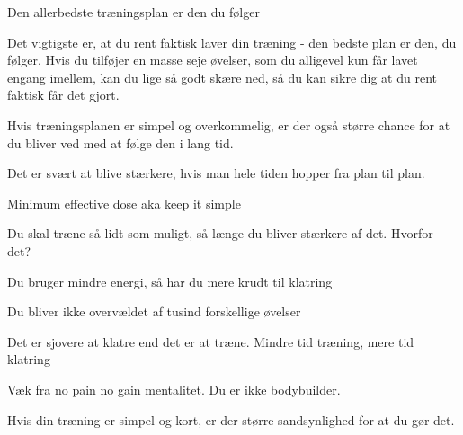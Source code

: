 \begin{multicols}{2}
  \begin{tList}{Den allerbedste træningsplan er den du følger}
  \item Det vigtigste er, at du rent faktisk laver din træning - den
    bedste plan er den, du følger. Hvis du tilføjer en masse seje
    øvelser, som du alligevel kun får lavet engang imellem, kan du
    lige så godt skære ned, så du kan sikre dig at du rent faktisk
    får det gjort.
  \item Hvis træningsplanen er simpel og overkommelig, er der også
    større chance for at du bliver ved med at følge den i lang tid.
  \item  Det er svært at blive stærkere, hvis man hele tiden hopper
    fra plan til plan.
  \end{tList}

\columnbreak

  \begin{tList}{Minimum effective dose aka keep it simple}
  \item Du skal træne så lidt som muligt, så længe du bliver stærkere
    af det. Hvorfor det?

  \item Du bruger mindre energi, så har du mere krudt til klatring
  \item Du bliver ikke overvældet af tusind forskellige øvelser
  \item Det er sjovere at klatre end det er at træne. Mindre tid
    træning, mere tid klatring

  \item Væk fra no pain no gain mentalitet. Du er ikke bodybuilder.
  \item Hvis din træning er simpel og kort, er der større
    sandsynlighed for at du gør det.
  \end{tList}

\end{multicols}
